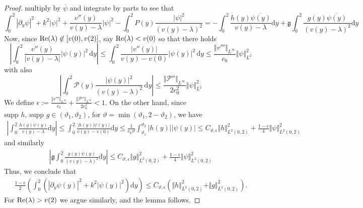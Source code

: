 \documentclass[11pt,reqno]{amsproc}
\theoremstyle{definition}
\numberwithin{equation}{section}
\renewcommand{\d}{\mathrm{d}}
\newcommand{\g}{{\mathfrak{g}}}
\renewcommand{\P}{{\mathcal{P}}}
\newcommand{\p}{\partial}
\def\Re{{\rm Re}}
\begin{document}
\begin{proof}
 multiply by $\overline{\psi}$ and integrate by parts to see that
\begin{equation}\label{eq:energyideigen}
\int_0^2  |\p_y \psi|^2 + k^2|\psi|^2 + \frac{v''(y)}{v(y) - \lambda}|\psi|^2 - \int_0^2 P(y) \frac{|\psi|^2}{(v(y)-\lambda)^2} =  - \int_0^2 \frac{h(y) \overline{\psi(y)}}{v(y) - \lambda} \d y +\g \int_0^2 \frac{g(y) \overline{\psi(y)}}{(v(y) - \lambda)^2} \d y
\end{equation}
Now, since $\Re(\lambda)\not \in [v(0),v(2)]$, say $\Re(\lambda) < v(0)$ so that there holds
\begin{equation*}
\left| \int_0^2 \frac{v''(y)}{|v(y) - \lambda|}|\psi(y)|^2 \,\d y \right| \leq \int_0^2 \frac{|v''(y)|}{v(y) - v(0)}|\psi(y)|^2 \,\d y \leq \frac{\Vert v''' \Vert_{L^\infty}}{c_0}\Vert \psi \Vert_{L^2}^2 
\end{equation*}
with also
\begin{equation*}
\left|\int_0^2 \P(y) \frac{|\psi(y)|^2}{(v(y) - \lambda)^2} \, \d y\right| \leq  \frac{\Vert \P'' \Vert_{L^\infty}}{2c_0^2}\Vert \psi \Vert_{L^2}^2 
\end{equation*}
We define $\epsilon := \frac{\Vert v''' \Vert_{L^\infty}}{c_0} +  \frac{\Vert \P'' \Vert_{L^\infty}}{2c_0^2} < 1$. On the other hand, since $\text{supp }h,\, \text{supp }g \in (\vartheta_1, \vartheta_2)$, for $\vartheta=\min(\vartheta_1,2-\vartheta_2)$, we have
\begin{align*}
\left| \int_0^2 \frac{h(y) \overline{\psi}(y)}{v(y) - \lambda}\d y \right| \leq \int_0^2 \frac{|h(y)|\psi(y)|}{v(y) - v(0)} \d y \leq \frac{1}{c_0\vartheta} \int_{\vartheta_1}^{\vartheta_2}|h(y)| |\psi(y)| \leq C_{\vartheta,\epsilon}\Vert h \Vert_{L^2(0,2)}^2 + \frac{1-\epsilon}{4}\Vert \psi \Vert_{L^2(0,2)}^2
\end{align*}
and similarly
\begin{align*}
\left| \g\int_0^2 \frac{g(y) \overline{\psi}(y)}{(v(y) - \lambda)^2}\d y \right| \leq C_{\vartheta,\epsilon}\Vert g \Vert_{L^2(0,2)}^2 + \frac{1-\epsilon}{4}\Vert \psi \Vert_{L^2(0,2)}^2
\end{align*}
Thus, we conclude that
\begin{align*}
\frac{1-\epsilon}{2}\left( \int_0^2 \left( |\partial_y \psi(y) |^2 + k^2 |\psi(y)|^2 \right)\d y \right) \leq C_{\vartheta,\epsilon}\left( \Vert h \Vert_{L^2(0,2)}^2 + \Vert g \Vert_{L^2(0,2)}^2 \right).
\end{align*}
For $\Re(\lambda) > v(2)$ we argue similarly, and the lemma follows.
\end{proof}
\end{document}
